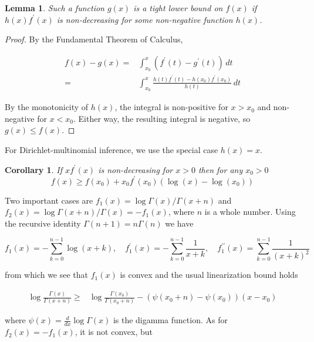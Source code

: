 \documentclass[nofootinbib,amssymb,amsmath]{revtex4}
\newtheorem{lemma}{Lemma}
\newtheorem{corollary}{Corollary}
\begin{document}
\begin{lemma}
Such a function $g(x)$ is a tight lower bound on $f(x)$ if $h(x) f^\prime(x)$ is non-decreasing for some non-negative function $h(x)$.
\end{lemma}

\begin{proof}
By the Fundamental Theorem of Calculus,

\begin{align}
f(x) - g(x) =& \int_{x_0}^{x} \left( f^\prime(t) - g^\prime(t) \right) \, dt \\
=&  \int_{x_0}^{x} \frac{ h(t) f^\prime(t) - h(x_0) f^\prime(x_0) } {h(t)} \, dt
\end{align}

By the monotonicity of $h(x)$, the integral is non-positive for $x > x_0$ and non-negative for $x < x_0$.  Either way, the resulting integral is negative, so $g(x) \le f(x)$.
\end{proof}

For Dirichlet-multinomial inference, we use the special case $h(x) = x$.

\begin{corollary} 
If $x f^\prime(x)$ is non-decreasing for $x > 0$ then for any $x_0 > 0$
\begin{equation}
f(x) \ge f(x_0) + x_0 f^\prime(x_0) \left( \log(x) - \log(x_0) \right)
\end{equation}
\end{corollary}


Two important cases are $f_1(x) = \log \Gamma(x) / \Gamma(x + n)$ and $f_2(x) = \log \Gamma(x + n) / \Gamma(x) = -f_1(x)$, where $n$ is a whole number.  Using the recursive identity $\Gamma(n+1) = n \Gamma(n)$ we have

\begin{equation}
f_1(x) = -\sum_{k=0}^{n-1} \log(x + k), \quad f^\prime_1(x) = -\sum_{k=0}^{n-1} \frac{1}{x+k}, \quad f_1^{\prime \prime}(x) = \sum_{k=0}^{n-1} \frac{1}{(x+k)^2}
\end{equation}

from which we see that $f_1(x)$ is convex and the usual linearization bound holds

\begin{align} \label{bound1}
\log \frac{ \Gamma(x) }{ \Gamma(x + n) } \ge & \log \frac{ \Gamma(x_0) }{ \Gamma(x_0 + n) } - \left( \psi(x_0 + n) - \psi(x_0) \right) (x - x_0)
\end{align}

where $\psi(x) = \frac{d}{dx} \log \Gamma(x)$ is the digamma function.  As for $f_2(x) = - f_1(x)$, it is not convex, but
\end{document}
